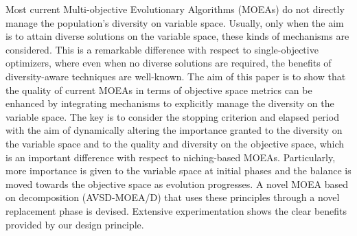 Most current Multi-objective Evolutionary Algorithms (MOEAs) do not directly manage 
the population's diversity on variable space.
%
Usually, only when the aim is to attain diverse solutions on the variable space, these kinds
of mechanisms are considered.
%
This is a remarkable difference with respect to single-objective optimizers, where
even when no diverse solutions are required, the benefits of diversity-aware 
techniques are well-known.
%
The aim of this paper is to show that the quality of current MOEAs in terms of objective space metrics can be
enhanced by integrating mechanisms to explicitly manage the diversity on the variable space.
%
The key is to consider the stopping criterion and elapsed period with the aim of dynamically altering the importance
granted to the diversity on the variable space and to the quality and diversity on the objective space,
which is an important difference with respect to niching-based MOEAs.
%
Particularly, more importance is given to the variable space at initial phases and the balance
is moved towards the objective space as evolution progresses.
%
A novel MOEA based on decomposition (AVSD-MOEA/D) that uses these principles through a novel replacement phase is
devised.
%
Extensive experimentation shows the clear benefits provided by our design principle. 

